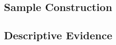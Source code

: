 \subsection{Sample Construction}\label{sec:data:samples}

%
%
%

\subsection{Descriptive Evidence}\label{sec:data:descriptive}

